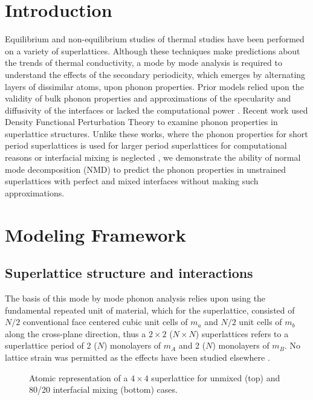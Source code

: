 \documentclass[aps,prb,preprint,preprintnumbers,amsmath,amssymb,floatfix,superscriptaddress]{revtex4}
\begin{document}
\section{Introduction}
Equilibrium \cite {PhysRevB.85.195302} and non-equilibrium \cite {PhysRevB.79.214307,PhysRevB.79.075316,PhysRevB.72.174302} studies of thermal studies have been performed on a variety of superlattices. Although these techniques make predictions about the trends of thermal conductivity, a mode by mode analysis is required to understand the effects of the secondary periodicity, which emerges by alternating layers of dissimilar atoms, upon phonon properties. Prior models relied upon the validity of bulk phonon properties and approximations of the specularity and diffusivity of the interfaces \cite {PhysRevB.57.14958} or lacked the computational power \cite {PhysRevB.70.081310}. Recent work \cite{Luckyanova16112012,doi:10.1021/nl202186y} used Density Functional Perturbation Theory to examine phonon properties in superlattice structures. Unlike these works, where the phonon properties for short period superlattices is used for larger period superlattices for computational reasons \cite{Luckyanova16112012, doi:10.1021/nl202186y} or interfacial mixing is neglected \cite{doi:10.1021/nl202186y}, we demonstrate the ability of normal mode decomposition (NMD) to predict the phonon properties in unstrained superlattices with perfect and mixed interfaces without making such approximations.
\section{Modeling Framework}
\subsection{Superlattice structure and interactions}
The basis of this mode by mode phonon analysis relies upon using the fundamental repeated unit of material, which for the superlattice, consisted of $N/2$ conventional face centered cubic unit cells of $m_a$ and $N/2$ unit cells of $m_b$ along the cross-plane direction, thus a $2\times2$ ($N\times N$) superlattices refers to a superlattice period of 2 ($N$) monolayers of $m_A$ and 2 ($N$) monolayers of $m_B$. No lattice strain was permitted as the effects have been studied elsewhere \cite{PhysRevB.72.174302}. 

\begin{figure*}[ht!]
\begin{center}
\renewcommand{\figure}{Fig.}
\caption{Atomic representation of a $4\times4$ superlattice for unmixed (top) and 80/20 interfacial mixing (bottom) cases.}
\label{fig:md_domain}
\end{center}
\end{figure*}
\end{document}

